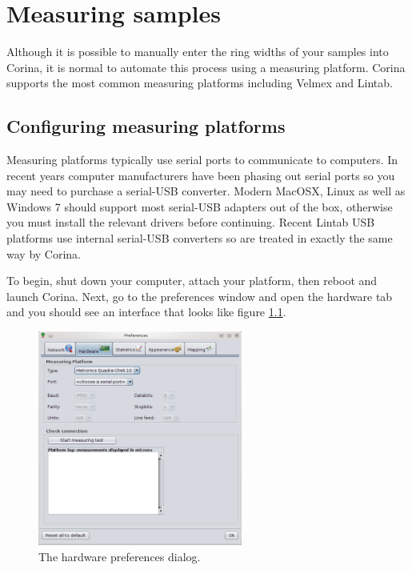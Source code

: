 \chapter{Measuring samples}
Although it is possible to manually enter the ring widths of your samples into Corina, it is normal to automate this process using a measuring platform. Corina supports the most common measuring platforms including Velmex and Lintab.

\section{Configuring measuring platforms}
Measuring platforms typically use serial ports to communicate to computers. In recent years computer manufacturers have been phasing out serial ports so you may need to purchase a serial-USB converter. Modern MacOSX, Linux as well as Windows 7 should support most serial-USB adapters out of the box, otherwise you must install the relevant drivers before continuing.  Recent Lintab USB platforms use internal serial-USB converters so are treated in exactly the same way by Corina.

To begin, shut down your computer, attach your platform, then reboot and launch Corina. Next, go to the preferences window and open the hardware tab and you should see an interface that looks like figure \ref{fig:hardwareprefs}.

\begin{figure}[hbtp]
  \centering
    \includegraphics[width=0.6\textwidth]{Images/hardwareprefs.png}
    \caption{The hardware preferences dialog.}
    \label{fig:hardwareprefs}
\end{figure}


